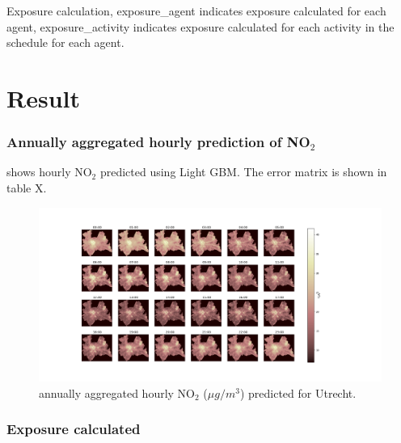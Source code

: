 \documentclass[]{article}
\begin{document}
\begin{algorithm}[H]
 
 \caption{Exposure calculation, exposure\_agent indicates exposure calculated for each agent, exposure\_activity indicates exposure calculated for each activity in the schedule for each agent.}
 \label{pc_e}
\end{algorithm}


\section{Result}
\label{sec:result}

\subsubsection{Annually aggregated hourly prediction of NO$_2$}

 shows hourly NO$_2$ predicted using Light GBM. The error matrix is shown in table X.  

\begin{figure}[h]
    \centering
        \includegraphics[scale = 0.3]{figure/prediUt.png}
    \caption{annually aggregated hourly NO$_2$ ($\mu g / m^3$) predicted for Utrecht.}
    \label{con}
\end{figure}

\subsubsection{Exposure calculated}
\end{document}

